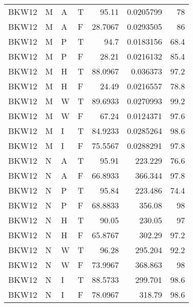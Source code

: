 \begin{tabular}{llllrrr}
    BKW12    & M     & A     & T          & 95.11      & 0.0205799  & 78       \\
    BKW12    & M     & A     & F          & 28.7067    & 0.0293505  & 86       \\
    BKW12    & M     & P     & T          & 94.7       & 0.0183156  & 68.4     \\
    BKW12    & M     & P     & F          & 28.21      & 0.0216132  & 85.4     \\
    BKW12    & M     & H     & T          & 88.0967    & 0.036373   & 97.2     \\
    BKW12    & M     & H     & F          & 24.49      & 0.0216557  & 78.8     \\
    BKW12    & M     & W     & T          & 89.6933    & 0.0270993  & 99.2     \\
    BKW12    & M     & W     & F          & 67.24      & 0.0124371  & 97.6     \\
    BKW12    & M     & I     & T          & 84.9233    & 0.0285264  & 98.6     \\
    BKW12    & M     & I     & F          & 75.5567    & 0.0288291  & 97.8     \\
    BKW12    & N     & A     & T          & 95.91      & 223.229    & 76.6     \\
    BKW12    & N     & A     & F          & 66.8933    & 366.344    & 97.8     \\
    BKW12    & N     & P     & T          & 95.84      & 223.486    & 74.4     \\
    BKW12    & N     & P     & F          & 68.8833    & 356.08     & 98       \\
    BKW12    & N     & H     & T          & 90.05      & 230.05     & 97       \\
    BKW12    & N     & H     & F          & 65.8767    & 302.29     & 97.2     \\
    BKW12    & N     & W     & T          & 96.28      & 295.204    & 92.2     \\
    BKW12    & N     & W     & F          & 73.9967    & 368.863    & 98       \\
    BKW12    & N     & I     & T          & 88.5733    & 299.701    & 98.6     \\
    BKW12    & N     & I     & F          & 78.0967    & 318.79     & 98.6     \\
    \hline
\end{tabular}